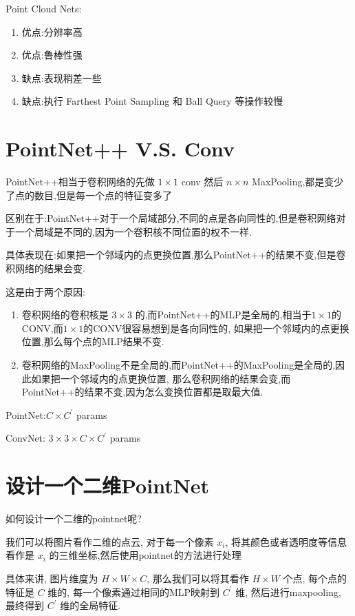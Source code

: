 Point Cloud Nets:
\begin{enumerate}
    \item 优点:分辨率高
    \item 优点:鲁棒性强
    \item 缺点:表现稍差一些
    \item 缺点:执行 Farthest Point Sampling 和 Ball Query 等操作较慢
\end{enumerate}

\section{PointNet++ V.S. Conv}

PointNet++相当于卷积网络的先做 $1\times 1$ conv 然后 $n\times n$ MaxPooling,都是变少了点的数目,但是每一个点的特征变多了

区别在于:PointNet++对于一个局域部分,不同的点是各向同性的,但是卷积网络对于一个局域是不同的,因为一个卷积核不同位置的权不一样.

具体表现在:如果把一个邻域内的点更换位置,那么PointNet++的结果不变,但是卷积网络的结果会变.

这是由于两个原因:
\begin{enumerate}
    \item 卷积网络的卷积核是 $3\times 3$ 的,而PointNet++的MLP是全局的,相当于$1\times 1$的CONV,而$1\times 1$的CONV很容易想到是各向同性的,
    如果把一个邻域内的点更换位置,那么每个点的MLP结果不变.
    \item 卷积网络的MaxPooling不是全局的,而PointNet++的MaxPooling是全局的,因此如果把一个邻域内的点更换位置,
    那么卷积网络的结果会变,而PointNet++的结果不变,因为怎么变换位置都是取最大值.
\end{enumerate}

PointNet:$C\times C^\prime$ params

ConvNet: $3\times 3\times C\times C^\prime$ params

\section{设计一个二维PointNet}

如何设计一个二维的pointnet呢?

我们可以将图片看作二维的点云, 对于每一个像素 $x_i$, 将其颜色或者透明度等信息看作是 $x_i$ 的三维坐标,然后使用pointnet的方法进行处理

具体来讲, 图片维度为 $H\times W\times C$, 那么我们可以将其看作 $H\times W$ 个点, 每个点的特征是 $C$ 维的, 
每一个像素通过相同的MLP映射到 $C^\prime$ 维, 然后进行maxpooling, 最终得到 $C^\prime$ 维的全局特征.